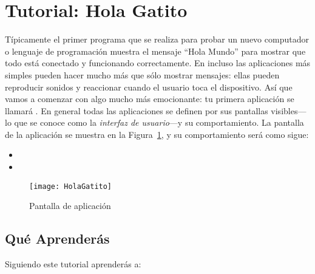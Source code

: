 \section{Tutorial: Hola Gatito}
\label{sec:tutor-hola-gatito}

Típicamente el primer programa que se realiza para probar un nuevo
computador o lenguaje de programación muestra el mensaje ``Hola
Mundo'' para mostrar que todo está conectado y funcionando
correctamente. En \AppInventor incluso las aplicaciones más simples
pueden hacer mucho más que sólo mostrar mensajes: ellas pueden
reproducir sonidos y reaccionar cuando el usuario toca el dispositivo.
Así que vamos a comenzar con algo mucho más emocionante: tu primera
aplicación se llamará . En general todas las
aplicaciones se definen por sus pantallas visibles---lo que se conoce
como la \textit{interfaz de usuario}---y su comportamiento. La
pantalla de la aplicación se muestra en la
Figura~\ref{fig:holaGatito}, y su comportamiento será como sigue:

\begin{itemize}
\item {}
\item {}
\end{itemize}

\begin{figure}[H]
  \centering
  \texttt{[image: HolaGatito]}
  \caption{Pantalla de aplicación }
  \label{fig:holaGatito}
\end{figure}

\subsection*{Qué Aprenderás}

Siguiendo este tutorial aprenderás a:

